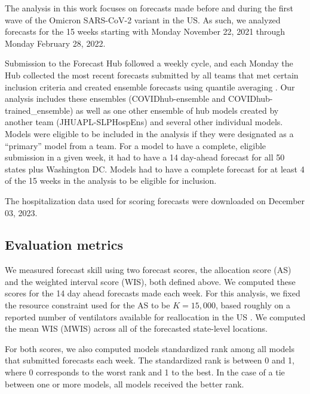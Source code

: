 \documentclass{article}\usepackage[]{graphicx}\usepackage[]{xcolor}
\begin{document}
The analysis in this work focuses on forecasts made before and during the first wave of the Omicron SARS-CoV-2 variant in the US.
As such, we analyzed forecasts for the 15 weeks starting with Monday November 22, 2021 through Monday February 28, 2022.

Submission to the Forecast Hub followed a weekly cycle, and each Monday the Hub collected the most recent forecasts submitted by all teams that met certain inclusion criteria and created ensemble forecasts using quantile averaging \citep{ray_comparing_2023}.
Our analysis includes these ensembles (COVIDhub-ensemble and COVIDhub-trained\_ensemble) as well as one other ensemble of hub models created by another team (JHUAPL-SLPHospEns) and several other individual models.
Models were eligible to be included in the analysis if they were designated as a ``primary'' model from a team.
For a model to have a complete, eligible submission in a given week, it had to have a 14 day-ahead forecast for all 50 states plus Washington DC.
Models had to have a complete forecast for at least 4 of the 15 weeks in the analysis to be eligible for inclusion.



The hospitalization data used for scoring forecasts were downloaded on December 03, 2023.

\subsection{Evaluation metrics}

We measured forecast skill using two forecast scores, the allocation score (AS) and the weighted interval score (WIS), both defined above.
We computed these scores for the 14 day ahead forecasts made each week.
For this analysis, we fixed the resource constraint used for the AS to be $K=15,000$, based roughly on a reported number of ventilators available for reallocation in the US \citep{ajao_assessing_2015}.
We computed the mean WIS (MWIS) across all of the forecasted state-level locations.

For both scores, we also computed models standardized rank among all models that submitted forecasts each week. The standardized rank is between 0 and 1, where 0 corresponds to the worst rank and 1 to the best. In the case of a tie between one or more models, all models received the better rank.
\end{document}
